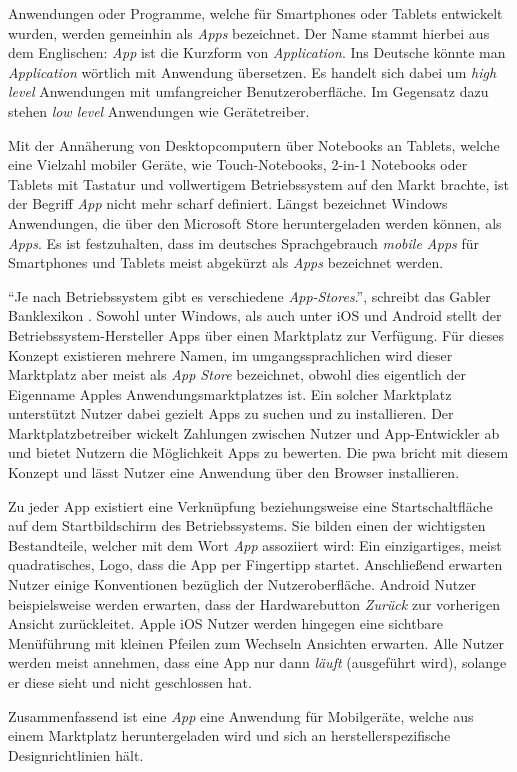 Anwendungen oder Programme, welche für Smartphones oder Tablets entwickelt wurden, werden gemeinhin als \textit{Apps} bezeichnet. Der Name stammt hierbei aus dem Englischen: \textit{App} ist die Kurzform von \textit{Application}. Ins Deutsche könnte man \textit{Application} wörtlich mit Anwendung übersetzen. \cite{BegriffApp} Es handelt sich dabei um \textit{high level} Anwendungen mit umfangreicher Benutzeroberfläche. Im Gegensatz dazu stehen \textit{low level} Anwendungen wie Gerätetreiber.

Mit der Annäherung von Desktopcomputern über Notebooks an Tablets, welche eine Vielzahl mobiler Geräte, wie Touch-Notebooks, 2-in-1 Notebooks oder Tablets mit Tastatur und vollwertigem Betriebssystem auf den Markt brachte, ist der Begriff \textit{App} nicht mehr scharf definiert.
Längst bezeichnet Windows Anwendungen, die über den Microsoft Store heruntergeladen werden können, als \textit{Apps}. Es ist festzuhalten, dass im deutsches Sprachgebrauch \textit{mobile Apps} für Smartphones und Tablets meist abgekürzt als \textit{Apps} bezeichnet werden.



``Je nach Betriebssystem gibt es verschiedene \textit{App-Stores}.'', schreibt das Gabler Banklexikon \cite{BegriffAppGabler}. Sowohl unter Windows, als auch unter iOS und Android stellt der Betriebssystem-Hersteller Apps über einen Marktplatz zur Verfügung. Für dieses Konzept existieren mehrere Namen, im umgangssprachlichen wird dieser Marktplatz aber meist als \textit{App Store} bezeichnet, obwohl dies eigentlich der Eigenname Apples Anwendungsmarktplatzes ist. 
Ein solcher Marktplatz unterstützt Nutzer dabei gezielt Apps zu suchen und zu installieren. Der Marktplatzbetreiber wickelt Zahlungen zwischen Nutzer und App-Entwickler ab und bietet Nutzern die Möglichkeit Apps zu bewerten. 
Die \acf{pwa} bricht mit diesem Konzept und lässt Nutzer eine Anwendung über den Browser installieren. 

Zu jeder App existiert eine Verknüpfung beziehungsweise eine Startschaltfläche auf dem Startbildschirm des Betriebssystems. Sie bilden einen der wichtigsten Bestandteile, welcher mit dem Wort \textit{App} assoziiert wird: Ein einzigartiges, meist quadratisches, Logo, dass die App per Fingertipp startet. Anschließend erwarten Nutzer einige Konventionen bezüglich der Nutzeroberfläche. Android Nutzer beispielsweise werden erwarten, dass der Hardwarebutton \textit{Zurück} zur vorherigen Ansicht zurückleitet. Apple iOS Nutzer werden hingegen eine sichtbare Menüführung mit kleinen Pfeilen zum Wechseln Ansichten erwarten. Alle Nutzer werden meist annehmen, dass eine App nur dann \textit{läuft} (ausgeführt wird), solange er diese sieht und nicht geschlossen hat.

Zusammenfassend ist eine \textit{App} eine Anwendung für Mobilgeräte, welche aus einem Marktplatz heruntergeladen wird und sich an herstellerspezifische Designrichtlinien hält.
